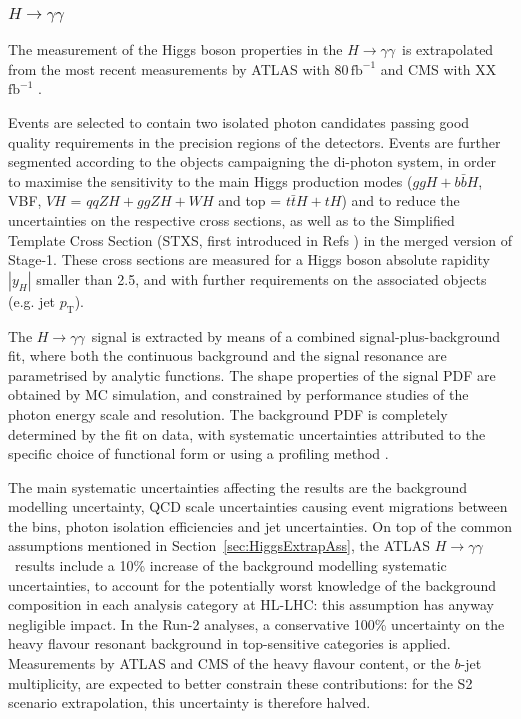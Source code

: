 \subsubsection{$H \to \gamma\gamma$}
\label{sec:Hgammagamma}

\newcommand{\Hyy}{\hbox{$H\to\gamma\gamma$}}

The measurement of the Higgs boson properties in the \Hyy\ is extrapolated from the most recent measurements by ATLAS with 80\,$\mathrm{fb}^{-1}$ \cite{ATLAS:2018uso} and CMS with XX\,$\mathrm{fb}^{-1}$ \cite{}.

Events are selected to contain two isolated photon candidates passing good quality requirements in the precision regions of the detectors. Events are further segmented according to the objects campaigning the di-photon system, in order to maximise the sensitivity to the main Higgs production modes ($ggH+b\bar{b}H$, VBF, $VH$ = $qqZH+ggZH+WH$ and top = $t\bar{t}H+tH$) and to reduce the uncertainties on the respective cross sections, as well as to the Simplified Template Cross Section (STXS, first introduced in Refs \cite{}) in the merged version of Stage-1. These cross sections are measured for a Higgs boson absolute rapidity $|y_H|$ smaller than 2.5, and with further requirements on the associated objects (e.g. jet $p_\mathrm{T}$).

The \Hyy\ signal is extracted by means of a combined signal-plus-background fit, where both the continuous background and the signal resonance are parametrised by analytic functions. The shape properties of the signal PDF are obtained by MC simulation, and constrained by performance studies of the photon energy scale and resolution. The background PDF is completely determined by the fit on data, with systematic uncertainties attributed to the specific choice of functional form \cite{} or using a profiling method \cite{}.

The main systematic uncertainties affecting the results are the background modelling uncertainty, QCD scale uncertainties causing event migrations between the bins, photon isolation efficiencies and jet uncertainties.
%
On top of the common assumptions mentioned in Section~\ref{sec:HiggsExtrapAss}, the ATLAS \Hyy\ results include a 10\% increase of the background modelling systematic uncertainties, to account for the potentially worst knowledge of the background composition in each analysis category at HL-LHC: this assumption has anyway negligible impact.
%
In the Run-2 analyses, a conservative 100\% uncertainty on the heavy flavour resonant background in top-sensitive categories is applied. Measurements by ATLAS and CMS of the heavy flavour content, or the $b$-jet multiplicity, are expected to better constrain these contributions: for the S2 scenario extrapolation, this uncertainty is therefore halved.

